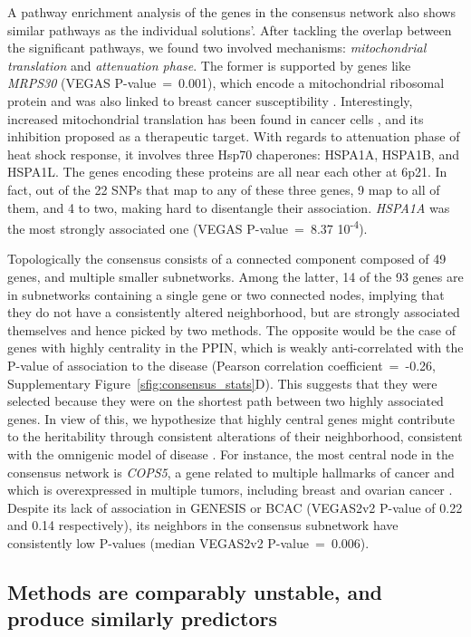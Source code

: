 \documentclass[twocolumn, 11pt]{article}
\begin{document}
A pathway enrichment analysis of the genes in the consensus network also shows similar pathways as the individual solutions'. After tackling the overlap between the significant pathways, we found two involved mechanisms: \emph{mitochondrial translation} and \emph{attenuation phase}. The former is supported by genes like \emph{MRPS30} (VEGAS P-value~=~0.001), which encode a mitochondrial ribosomal protein and was also linked to breast cancer susceptibility \cite{quigley_5p12_2014}. Interestingly, increased mitochondrial translation has been found in cancer cells \cite{Yu2016Repositioning}, and its inhibition proposed as a therapeutic target. With regards to attenuation phase of heat shock response, it involves three Hsp70 chaperones: HSPA1A, HSPA1B, and HSPA1L. The genes encoding these proteins are all near each other at 6p21. In fact, out of the 22 SNPs that map to any of these three genes, 9 map to all of them, and 4 to two, making hard to disentangle their association. \emph{HSPA1A} was the most strongly associated one (VEGAS P-value~=~8.37 \texttimes{} 10\textsuperscript{-4}).  

Topologically the consensus consists of a connected component composed of 49 genes, and multiple smaller subnetworks. Among the latter, 14 of the 93 genes are in subnetworks containing a single gene or two connected nodes, implying that they do not have a consistently altered neighborhood, but are strongly associated themselves and hence picked by two methods. The opposite would be the case of genes with highly centrality in the PPIN, which is weakly anti-correlated with the P-value of association to the disease (Pearson correlation coefficient~=~-0.26, Supplementary Figure~\ref{sfig:consensus_stats}D). This suggests that they were selected because they were on the shortest path between two highly associated genes. In view of this, we hypothesize that highly central genes might contribute to the heritability through consistent alterations of their neighborhood, consistent with the omnigenic model of disease \cite{boyle_expanded_2017}. For instance, the most central node in the consensus network is \emph{COPS5}, a gene related to multiple hallmarks of cancer and which is overexpressed in multiple tumors, including breast and ovarian cancer \cite{liu_jab1_cops5_2018}. Despite its lack of association in GENESIS or BCAC (VEGAS2v2 P-value of 0.22 and 0.14 respectively), its neighbors in the consensus subnetwork have consistently low P-values (median VEGAS2v2 P-value~=~0.006).

\subsection{Methods are comparably unstable, and produce similarly predictors}
\end{document}
